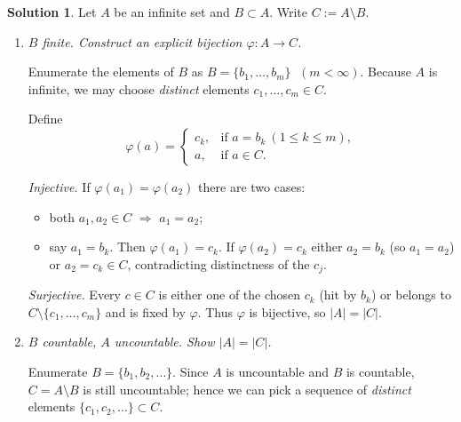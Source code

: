 \documentclass[12pt]{article}
\theoremstyle{definition} %
\newtheorem{solution}{Solution}
\theoremstyle{plain} %
\begin{document}
\begin{solution}
  
Let \(A\) be an infinite set and \(B\subset A\).  
Write \(C:=A\setminus B\).

\begin{enumerate}[label=\textbf{(\alph*)}]
\item \textit{\(B\) finite.  Construct an explicit bijection
      \(\varphi:A\to C\).}

      Enumerate the elements of \(B\) as
      \(B=\{b_{1},\dots,b_{m}\}\) \(\;(m<\infty)\).
      Because \(A\) is infinite, we may choose \emph{distinct}
      elements \(c_{1},\dots,c_{m}\in C\).

      Define
      \[
         \varphi(a)=
         \begin{cases}
            c_{k}, &\text{if }a=b_{k}\ (1\le k\le m),\\[4pt]
            a,     &\text{if }a\in C.
         \end{cases}
      \]

      \emph{Injective.}
      If \(\varphi(a_{1})=\varphi(a_{2})\) there are two cases:
      \begin{itemize}
         \item both \(a_{1},a_{2}\in C\) \(\Rightarrow\) \(a_{1}=a_{2}\);
         \item say \(a_{1}=b_{k}\).  Then
               \(\varphi(a_{1})=c_{k}\).
               If \(\varphi(a_{2})=c_{k}\) either \(a_{2}=b_{k}\)
               (so \(a_{1}=a_{2}\)) or \(a_{2}=c_{k}\in C\),
               contradicting distinctness of the \(c_{j}\).
      \end{itemize}

      \emph{Surjective.}
      Every \(c\in C\) is either one of the chosen \(c_{k}\) (hit by
      \(b_{k}\)) or belongs to \(C\setminus\{c_{1},\dots,c_{m}\}\) and
      is fixed by \(\varphi\).
      Thus \(\varphi\) is bijective, so \(|A|=|C|\).

\item \textit{\(B\) countable, \(A\) uncountable.
      Show \(|A|=|C|\).}

      Enumerate \(B=\{b_{1},b_{2},\dots\}\).
      Since \(A\) is uncountable and \(B\) is countable,
      \(C=A\setminus B\) is still uncountable; hence
      we can pick a sequence of \emph{distinct} elements
      \(\{c_{1},c_{2},\dots\}\subset C\).


\end{enumerate}
\end{solution}
\end{document}

